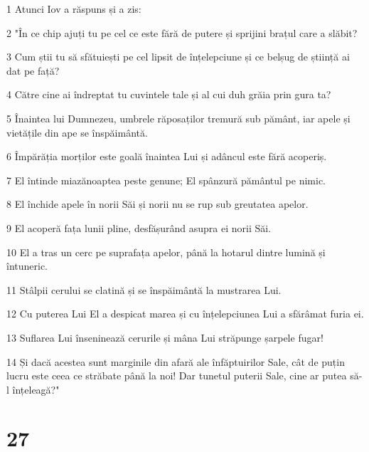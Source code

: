 \par 1 Atunci Iov a răspuns și a zis:
\par 2 "În ce chip ajuți tu pe cel ce este fără de putere și sprijini brațul care a slăbit?
\par 3 Cum știi tu să sfătuiești pe cel lipsit de înțelepciune și ce belșug de știință ai dat pe față?
\par 4 Către cine ai îndreptat tu cuvintele tale și al cui duh grăia prin gura ta?
\par 5 Înaintea lui Dumnezeu, umbrele răposaților tremură sub pământ, iar apele și vietățile din ape se înspăimântă.
\par 6 Împărăția morților este goală înaintea Lui și adâncul este fără acoperiș.
\par 7 El întinde miazănoaptea peste genune; El spânzură pământul pe nimic.
\par 8 El închide apele în norii Săi și norii nu se rup sub greutatea apelor.
\par 9 El acoperă fața lunii pline, desfășurând asupra ei norii Săi.
\par 10 El a tras un cerc pe suprafața apelor, până la hotarul dintre lumină și întuneric.
\par 11 Stâlpii cerului se clatină și se înspăimântă la mustrarea Lui.
\par 12 Cu puterea Lui El a despicat marea și cu înțelepciunea Lui a sfărâmat furia ei.
\par 13 Suflarea Lui înseninează cerurile și mâna Lui străpunge șarpele fugar!
\par 14 Și dacă acestea sunt marginile din afară ale înfăptuirilor Sale, cât de puțin lucru este ceea ce străbate până la noi! Dar tunetul puterii Sale, cine ar putea să-l înțeleagă?"

\chapter{27}

